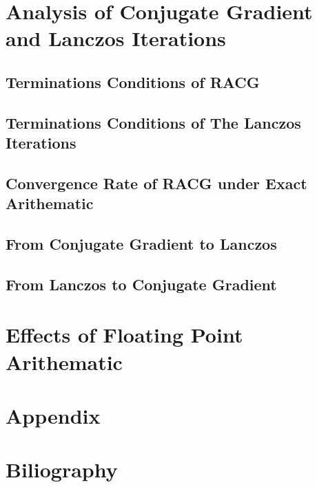 \documentclass[]{article}
\theoremstyle{definition}
\begin{document}
\section{Analysis of Conjugate Gradient and Lanczos Iterations}
    \subsection{Terminations Conditions of RACG}

    \subsection{Terminations Conditions of The Lanczos Iterations}

    \subsection{Convergence Rate of RACG under Exact Arithematic}

    \subsection{From Conjugate Gradient to Lanczos}

    \subsection{From Lanczos to Conjugate Gradient}

\section{Effects of Floating Point Arithematic}
\section{Appendix}
\section{Biliography}
            
            
\end{document}
